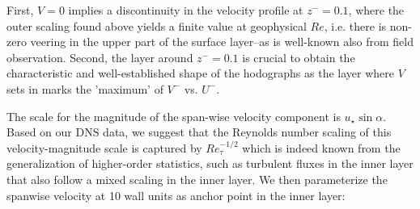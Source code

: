 \documentclass[smallcondensed,final]{svjour3}
\begin{document}
First, $V=0$  implies a discontinuity in the velocity profile at $z^-=0.1$, where the outer scaling found above 
yields a finite value at geophysical $Re$, i.e. there is non-zero veering in the upper part of the
surface layer--as is well-known also from field observation. 
%
Second, the layer around $z^-=0.1$ is crucial to obtain the characteristic and well-established shape of the hodographs as the layer
where $V$ sets in marks the 'maximum' of $V^-$ vs. $U^-$.
%
%
\par
%
The scale for the magnitude of the span-wise velocity component is $u_\star\sin\alpha$. 
%
Based on our DNS data, we suggest that the Reynolds number scaling of this velocity-magnitude scale is captured
by $Re_\tau^{-1/2}$ which is indeed known from the generalization of higher-order statistics, such as turbulent fluxes
in the inner layer \citep{marusic:JFM2013} that also follow a mixed scaling in the inner layer.
%
We then parameterize the spanwise velocity at 10 wall units as anchor point in the inner layer:
\end{document}
